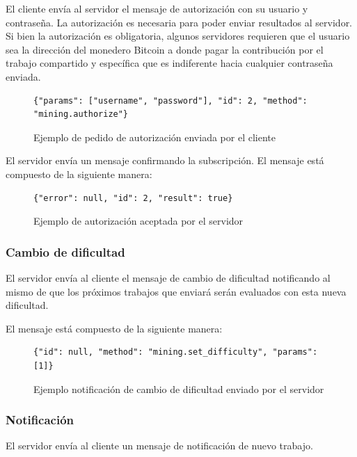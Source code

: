 \documentclass[a4paper, 10pt, twoside]{article}
\begin{document}
El cliente envía al servidor el mensaje de autorización con su usuario y contraseña. La autorización es necesaria para poder enviar resultados al servidor. Si bien la autorización es obligatoria, algunos servidores requieren que el usuario sea la dirección del monedero Bitcoin a donde pagar la contribución por el trabajo compartido y específica que es indiferente hacia cualquier contraseña enviada.

\begin{figure}[H]
\centering
\begin{lstlisting}
{"params": ["username", "password"], "id": 2, "method": "mining.authorize"}
\end{lstlisting}
\caption{Ejemplo de pedido de autorización enviada por el cliente}
\end{figure}

El servidor envía un mensaje confirmando la subscripción. El mensaje está compuesto de la siguiente manera:

\begin{figure}[H]
\centering
\begin{lstlisting}
{"error": null, "id": 2, "result": true}
\end{lstlisting}
\caption{Ejemplo de autorización aceptada por el servidor}
\end{figure}

\subsubsection{Cambio de dificultad}

El servidor envía al cliente el mensaje de cambio de dificultad notificando al mismo de que los próximos trabajos que enviará serán evaluados con esta nueva dificultad.

El mensaje está compuesto de la siguiente manera:

\begin{figure}[H]
\centering
\begin{lstlisting}
{"id": null, "method": "mining.set_difficulty", "params": [1]}
\end{lstlisting}
\caption{Ejemplo notificación de cambio de dificultad enviado por el servidor}
\end{figure}

\subsubsection{Notificación}

El servidor envía al cliente un mensaje de notificación de nuevo trabajo.
\end{document}
